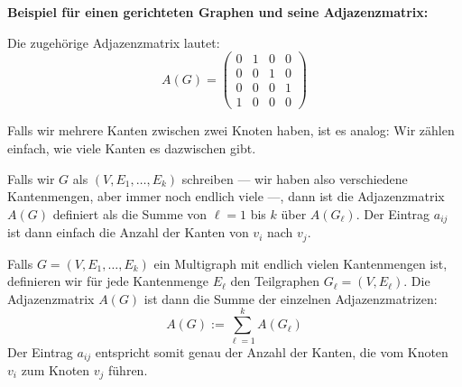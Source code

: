 \begin{math-stroke}
\textbf{Beispiel für einen gerichteten Graphen und seine Adjazenzmatrix:}
\begin{center}
\end{center}
Die zugehörige Adjazenzmatrix lautet:
\[
A(G) = \begin{pmatrix}
0 & 1 & 0 & 0 \\
0 & 0 & 1 & 0 \\
0 & 0 & 0 & 1 \\
1 & 0 & 0 & 0
\end{pmatrix}
\]
\end{math-stroke}

\begin{spoken-clean}[00:31:12 - 00:32:57]
Falls wir mehrere Kanten zwischen zwei Knoten haben, ist es analog: Wir zählen einfach, wie viele Kanten es dazwischen gibt.

Falls wir $G$ als $(V, E_1, \dots, E_k)$ schreiben --- wir haben also verschiedene Kantenmengen, aber immer noch endlich viele ---, dann ist die Adjazenzmatrix $A(G)$ definiert als die Summe von $\ell = 1$ bis $k$ über $A(G_\ell)$. Der Eintrag $a_{ij}$ ist dann einfach die Anzahl der Kanten von $v_i$ nach $v_j$.
\end{spoken-clean}

\begin{math-stroke}
Falls $G = (V, E_1, \dots, E_k)$ ein Multigraph mit endlich vielen Kantenmengen ist, definieren wir für jede Kantenmenge $E_\ell$ den Teilgraphen $G_\ell = (V, E_\ell)$. Die Adjazenzmatrix $A(G)$ ist dann die Summe der einzelnen Adjazenzmatrizen:
\begin{equation}
A(G) := \sum_{\ell=1}^k A(G_\ell)
\end{equation}
Der Eintrag $a_{ij}$ entspricht somit genau der Anzahl der Kanten, die vom Knoten $v_i$ zum Knoten $v_j$ führen.
\end{math-stroke}

